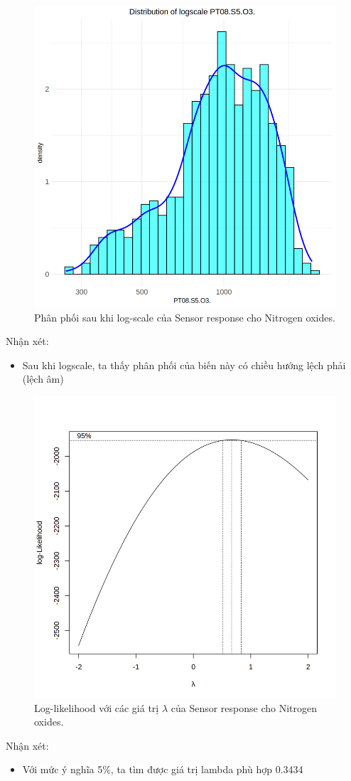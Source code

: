 \begin{figure}[H]
    \centering
    \includegraphics[width=0.75\columnwidth]{air_figures/PT08.S5(O3)_logscale_distribution.png}
    \caption{Phân phối sau khi log-scale của Sensor response cho Nitrogen oxides.}
    \label{fig:pto3_logscale_distribution}
\end{figure}
Nhận xét:
\begin{itemize}
    \item Sau khi logscale, ta thấy phân phối của biến này có chiều hướng lệch phải (lệch âm)
\end{itemize}

\begin{figure}[H]
    \centering
    \includegraphics[width=0.75\columnwidth]{air_figures/PT08.S5(O3)_optimal_lambda.png}
    \caption{Log-likelihood với các giá trị $\lambda$ của Sensor response cho Nitrogen oxides.}
    \label{fig:pto3_optimal_lambda}
\end{figure}
Nhận xét:
\begin{itemize}
    \item Với mức ý nghĩa 5\%, ta tìm được giá trị lambda phù hợp 0.3434
\end{itemize}

